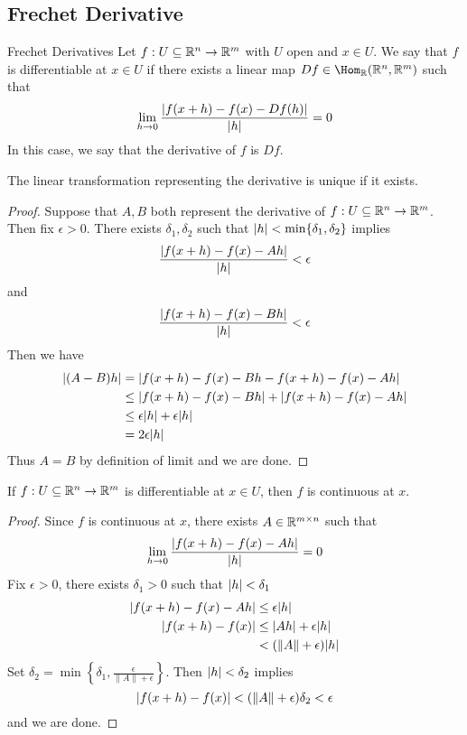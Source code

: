 \documentclass[a4paper]{article}
\begin{document}
\subsection{Frechet Derivative}
\begin{defn}{Frechet Derivatives}{} Let $f:U\subseteq\mathbb{R}^n\to\mathbb{R}^m$ with $U$ open and $x\in U$. We say that $f$ is differentiable at $x\in U$ if there exists a linear map $Df\in\Hom_\R(\R^n,\R^m)$ such that $$\lim_{h\to 0}\frac{\abs{f(x +h)-f(x)-Df(h)}}{\abs{h}}=0$$ In this case, we say that the derivative of $f$ is $Df$. 
\end{defn}

\begin{prp}{}{} The linear transformation representing the derivative is unique if it exists. 
\begin{proof}
Suppose that $A,B$ both represent the derivative of $f:U\subseteq\mathbb{R}^n\to\mathbb{R}^m$. Then fix $\epsilon>0$. There exists $\delta_1,\delta_2$ such that $\abs{h}<\min\{\delta_1,\delta_2\}$ implies $$\frac{\abs{f(x+h)-f(x)-Ah}}{\abs{h}}<\epsilon$$ and $$\frac{\abs{f(x+h)-f(x)-Bh}}{\abs{h}}<\epsilon$$ Then we have 
\begin{align*}
\abs{(A-B)h}&=\abs{f(x+h)-f(x)-Bh-f(x+h)-f(x)-Ah}\\
&\leq\abs{f(x+h)-f(x)-Bh}+\abs{f(x+h)-f(x)-Ah}\\
&\leq\epsilon\abs{h}+\epsilon\abs{h}\\
&=2\epsilon\abs{h}
\end{align*}
Thus $A=B$ by definition of limit and we are done. 
\end{proof}
\end{prp}

\begin{prp}{}{} If $f:U\subseteq\mathbb{R}^n\to\mathbb{R}^m$ is differentiable at $x\in U$, then $f$ is continuous at $x$. 
\begin{proof}
Since $f$ is continuous at $x$, there exists $A\in\mathbb{R}^{m\times n}$ such that $$\lim_{h\to 0}\frac{\abs{f(x+h)-f(x)-Ah}}{\abs{h}}=0$$ Fix $\epsilon>0$, there exists $\delta_1>0$ such that $\abs{h}<\delta_1$ 
\begin{align*}
\abs{f(x+h)-f(x)-Ah}&\leq\epsilon\abs{h}\\
\abs{f(x+h)-f(x)}&\leq\abs{Ah}+\epsilon\abs{h}\\
&<(\|A\|+\epsilon)\abs{h}
\end{align*}
Set $\delta_2=\min\left\{\delta_1,\frac{\epsilon}{\|A\|+\epsilon}\right\}$. Then $\abs{h}<\delta_2$ implies $$\abs{f(x+h)-f(x)}<(\|A\|+\epsilon)\delta_2<\epsilon$$ and we are done. 
\end{proof}
\end{prp}
\end{document}
